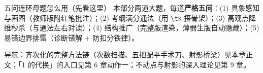 
\begin{warmupbox}{五问连环母题怎么用（先看这里）}
本部分两道大题，每道\textbf{严格五问}：(1) 具象感知与画图（教师版附红笔批注）；(2) 考纲满分通法（用 \texttt{\textbackslash tk} 搭骨架）；(3) 高观点降维秒杀（与通法左右对读）；(4) 结构推广（完整版渲染，薄弱生版自动隐藏）；(5) 易错边界排雷（诊断错解 + 防扣分铁律）。

导航：齐次化的完整方法链（次数扫描、五把配平手术刀、射影桥梁）见本章正文；「1 的代换」的入口见第 6 章动作一；不动点与射影的深入理论见第 9 章。
\end{warmupbox}


